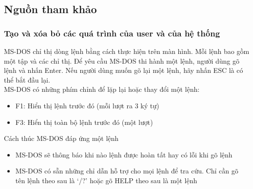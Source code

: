 \documentclass[12pt,a4paper]{article}
\begin{document}
\subsection{Nguồn tham khảo}
\subsubsection{Tạo và xóa bỏ các quá trình của user và của hệ thống}
MS-DOS chỉ thị dòng lệnh bằng cách thực hiện trên màn hình. Mỗi lệnh bao gồm một tập và các chỉ thị. Để yêu cầu MS-DOS thi hành một lệnh, người dùng gõ lệnh và nhấn Enter. Nếu người dùng muốn gõ lại một lệnh, hãy nhấn ESC là có thể bắt đầu lại.\\
MS-DOS có những phím chỉnh để lặp lại hoặc thay đổi một lệnh:\\
\begin{itemize}
	\item F1: Hiển thị lệnh trước đó (mỗi lượt ra 3 ký tự) 
	\item F3: Hiển thị toàn bộ lệnh trước đó (một lượt)
\end{itemize}
Cách thúc MS-DOS đáp ứng một lệnh\\
\begin{itemize}
	\item MS-DOS sẽ thông báo khi nào lệnh được hoàn tất hay có lỗi khi gõ lệnh
	\item MS-DOS có sẵn những chỉ dẫn hỗ trợ cho mọi lệnh để tra cứu. Chỉ cần gõ tên lệnh theo sau là ‘/?’ hoặc gõ HELP theo sau là một lệnh
\end{itemize}
\end{document}
